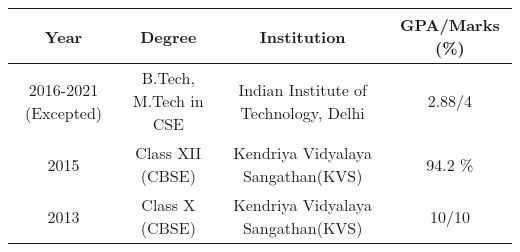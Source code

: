 

\begin{cvparagraph}
\begin{table}[h]
\begin{tabular}{|c|c|c|c|}
\hline
Year & Degree  & Institution &  GPA/Marks (\%) \\ \hline
2016-2021 (Excepted) & B.Tech, M.Tech in CSE & Indian Institute of Technology, Delhi & 2.88/4 \\ \hline
2015 & Class XII (CBSE) & Kendriya Vidyalaya Sangathan(KVS) & 94.2 \% \\ \hline
2013 & Class X (CBSE) & Kendriya Vidyalaya Sangathan(KVS) & 10/10 \\ \hline
\end{tabular}
\end{table}
\end{cvparagraph}